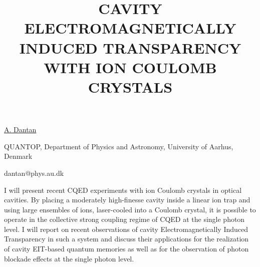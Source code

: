 \title{CAVITY ELECTROMAGNETICALLY INDUCED TRANSPARENCY WITH ION COULOMB CRYSTALS}

\underline{A. Dantan} 

\vspace{-4mm}
{\normalsize{QUANTOP, Department of Physics and Astronomy, University of Aarhus, Denmark

\email dantan@phys.au.dk}}

I will present recent CQED experiments with ion Coulomb crystals in optical cavities. By placing a moderately high-finesse cavity inside a linear ion trap and using large ensembles of ions, laser-cooled into a Coulomb crystal, it is possible to operate in the collective strong coupling regime of CQED at the single photon level. I will report on recent observations of cavity Electromagnetically Induced Transparency in such a system and discuss their applications for the realization of cavity EIT-based quantum memories as well as for the observation of photon blockade effects at the single photon level.

\vspace{\baselineskip} 